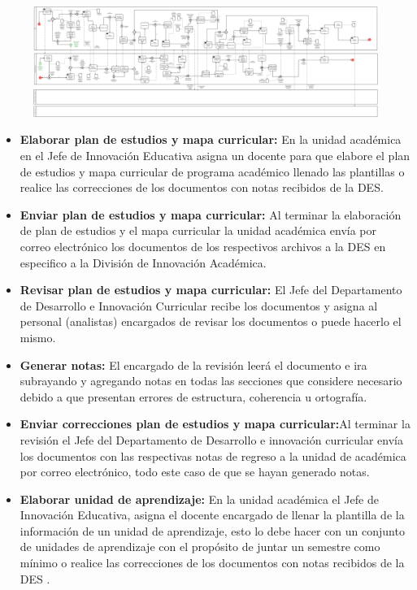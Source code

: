 \hypertarget{MP-I}{\begin{figure}[htbp]
	\begin{center}
		\includegraphics[width=.95\textwidth]{C1-DP/MP/bpmnMacro.png}
		\caption{}
		\label{fig:}
	\end{center}
\end{figure}}
\begin{itemize}
	\item \textbf{Elaborar plan de estudios y mapa curricular:} En la unidad académica en el Jefe de Innovación Educativa asigna un docente para que elabore el plan de estudios y mapa curricular de programa académico llenado las plantillas o realice las correcciones de los documentos con notas recibidos de la DES.  
	\item \textbf{Enviar plan de estudios y mapa curricular:} Al terminar la elaboración de plan de estudios y el mapa curricular la unidad académica envía por correo electrónico los documentos de los respectivos archivos a la DES en especifico a la División de Innovación Académica.  
	\item \textbf{Revisar plan de estudios y mapa curricular:} El Jefe del Departamento de Desarrollo e Innovación Curricular recibe los documentos y asigna al personal (analistas) encargados de revisar los documentos o puede hacerlo el mismo. 
	\item \textbf{Generar notas:} El encargado de la revisión leerá el documento e ira subrayando y agregando notas en todas las secciones que considere necesario debido a que presentan errores de estructura, coherencia u ortografía.   
	\item \textbf{Enviar correcciones plan de estudios y mapa curricular:}Al terminar la revisión el Jefe del Departamento de Desarrollo e innovación curricular envía los documentos con las respectivas notas de regreso a la unidad de académica por correo electrónico, todo este caso de que se hayan generado notas. 
	\item \textbf{Elaborar unidad de aprendizaje:} En la unidad académica el Jefe de Innovación Educativa, asigna el docente encargado de llenar la plantilla de la información de un unidad de aprendizaje, esto lo debe hacer con un conjunto de unidades de aprendizaje con el propósito de juntar un semestre como mínimo o realice las correcciones de los documentos con notas recibidos de la DES .     

\end{itemize}
